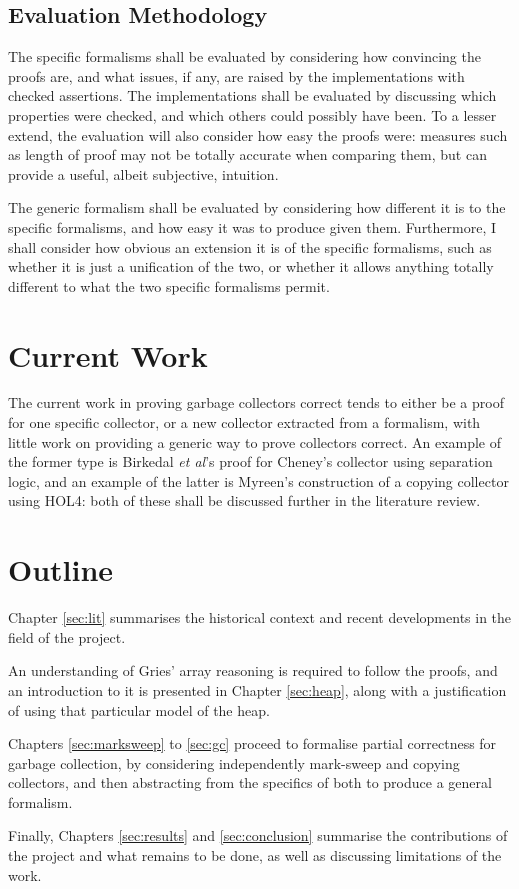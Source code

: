 \subsection{Evaluation Methodology}
\label{sec:intro-goals-evaluation}

The specific formalisms shall be evaluated by considering how
convincing the proofs are, and what issues, if any, are raised by the
implementations with checked assertions. The implementations shall be
evaluated by discussing which properties were checked, and which
others could possibly have been. To a lesser extend, the evaluation
will also consider how easy the proofs were: measures such as length
of proof may not be totally accurate when comparing them, but can
provide a useful, albeit subjective, intuition.

The generic formalism shall be evaluated by considering how different
it is to the specific formalisms, and how easy it was to produce given
them. Furthermore, I shall consider how obvious an extension it is of
the specific formalisms, such as whether it is just a unification of
the two, or whether it allows anything totally different to what the
two specific formalisms permit.

\section{Current Work}
\label{sec:intro-current}

The current work in proving garbage collectors correct tends to either
be a proof for one specific collector, or a new collector extracted
from a formalism, with little work on providing a generic way to prove
collectors correct. An example of the former type is Birkedal
\textit{et al}'s\cite{Birkedal04} proof for Cheney's collector using
separation logic, and an example of the latter is
Myreen's\cite{Myreen10} construction of a copying collector using
HOL4: both of these shall be discussed further in the literature
review.
\section{Outline}
\label{sec:intro-outline}

Chapter \ref{sec:lit} summarises the historical context and recent
developments in the field of the project.

An understanding of Gries' array reasoning\cite{Gries87} is required
to follow the proofs, and an introduction to it is presented in
Chapter \ref{sec:heap}, along with a justification of using that
particular model of the heap.

Chapters \ref{sec:marksweep} to \ref{sec:gc} proceed to formalise
partial correctness for garbage collection, by considering
independently mark-sweep and copying collectors, and then abstracting
from the specifics of both to produce a general formalism.

Finally, Chapters \ref{sec:results} and \ref{sec:conclusion} summarise
the contributions of the project and what remains to be done, as well
as discussing limitations of the work.
